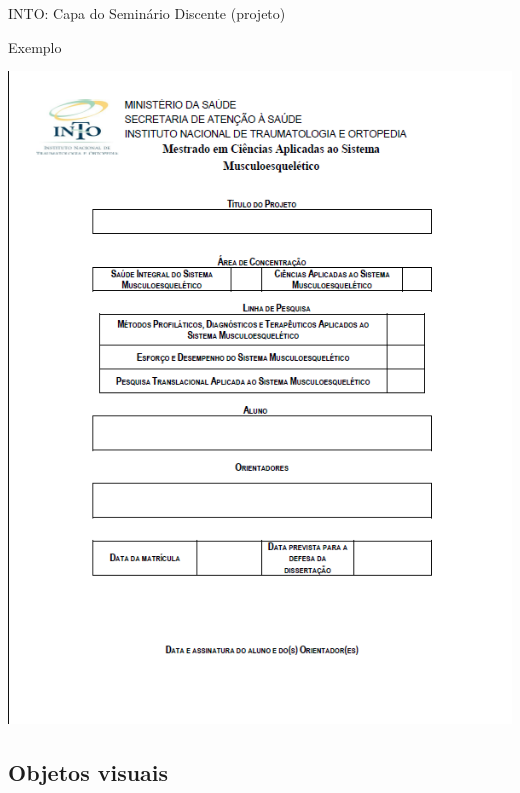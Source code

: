 \documentclass{beamer}
\begin{document}
\begin{frame}{\scriptsize INTO: Capa do Seminário Discente (projeto)}
  \begin{exampleblock}{Exemplo}
    \begin{center}
      \includegraphics[height=.8\textheight]{EstruturaII/projeto}
    \end{center}
  \end{exampleblock}
\end{frame}

\subsection{Objetos visuais}
\end{document}
